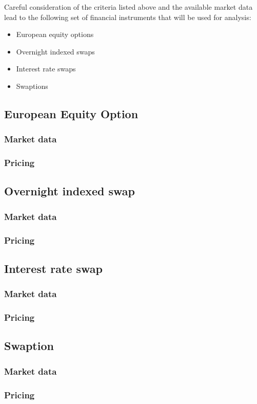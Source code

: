 \documentclass[../Thesis_AHoecherl.tex]{subfiles}
\begin{document}
    Careful consideration of the criteria listed above and the available market data lead to the following set of financial instruments that will be used for analysis:

    \begin{itemize}
        \item European equity options
        \item Overnight indexed swaps
        \item Interest rate swaps
        \item Swaptions
    \end{itemize}

    \subsection{European Equity Option}

    

    \subsubsection{Market data}
    \subsubsection{Pricing}
    \subsection{Overnight indexed swap}
    \subsubsection{Market data}
    \subsubsection{Pricing}
    \subsection{Interest rate swap}
    \subsubsection{Market data}
    \subsubsection{Pricing} 
    \subsection{Swaption}
    \subsubsection{Market data}
    \subsubsection{Pricing}
\end{document}
